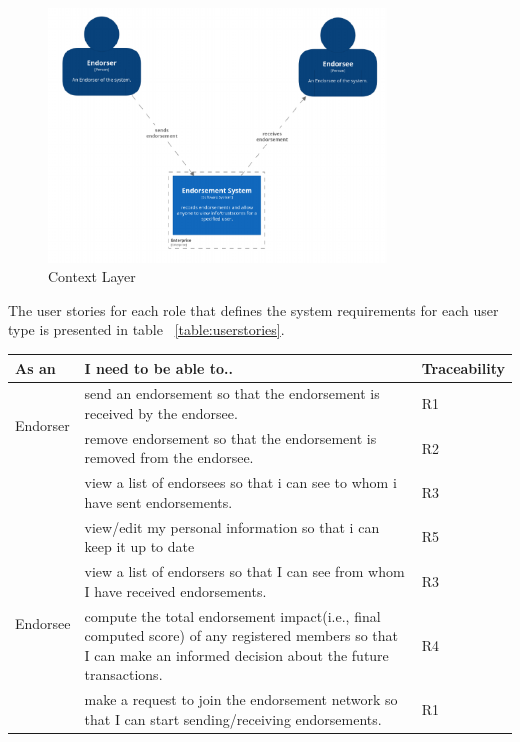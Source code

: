 \begin{figure}
	\centering
	\includegraphics[width=0.8\textwidth]{Images/1SystemContext.eps}
	\caption{Context Layer}
	\label{fig:context}
\end{figure}

The user stories for each role that defines the system requirements for each
user type is presented in table ~\ref{table:userstories}. 
\begin{center} \label{table:userstories}
	\begin{tabular} {| l | p{9cm} | l |}
		\hline
		\textbf{As an}  & \textbf{I need to be able to..}   & \textbf{Traceability} \\
		\hline
		\multirow{2}{*}{Endorser} & send an endorsement so that the endorsement
		is received by the endorsee.& R1
		\\\cline{2-3} 
		& remove endorsement so that the endorsement is removed from the
		endorsee.  & R2 \\\cline{2-3}
		& view a list of endorsees so that i can see to whom i have sent
		endorsements.& R3 \\\cline{2-3}
		& view/edit my personal information so that i can keep it up to
		date& R5 \\\cline{2-3}
		\hline
		\multirow{2}{*}{Endorsee} & view a list of endorsers so that I can see
		from whom I have received endorsements.& R3 \\\cline{2-3}
		\hline
		\multirow{2}{*}{other users} & compute the total endorsement
		impact(i.e., final computed score) of any registered members so that I
		can make an informed decision about the future transactions.
		& R4 \\\cline{2-3}
		& make a request to join the endorsement network so that I can start
		sending/receiving endorsements.  
		& R1 \\\cline{2-3}
		\hline
	\end{tabular}
\end{center}

